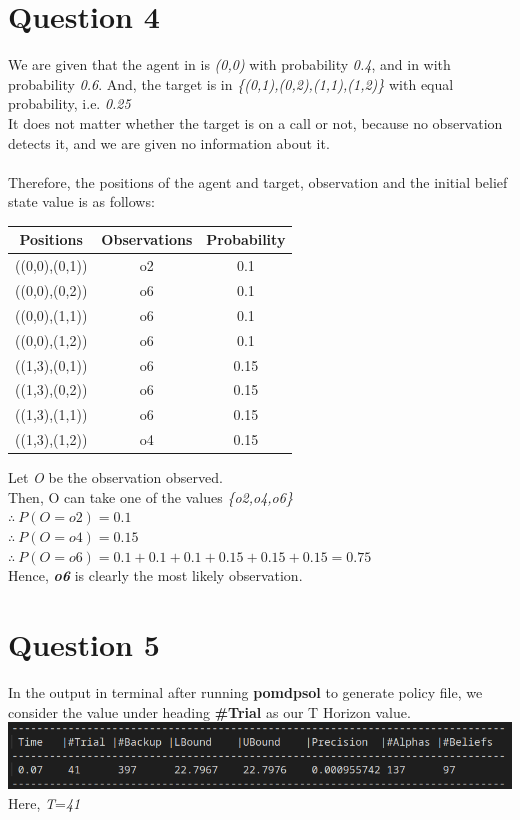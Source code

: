 \documentclass[12pt]{report}
\theoremstyle{definition}
\theoremstyle{plain}
\begin{document}
\section*{Question 4}
We are given that the agent in is \emph{(0,0)} with probability \emph{0.4}, and in  with probability \emph{0.6}. And, the target is in \emph{\{(0,1),(0,2),(1,1),(1,2)\}} with equal probability, i.e. \emph{0.25} \\
It does not matter whether the target is on a call or not, because no observation detects it, and we are given no information about it. \\ \\
Therefore, the positions of the agent and target, observation and the initial belief state value is as follows: \\
\begin{center}
 \begin{tabular}{||c | c | c ||} 
 \hline
 Positions & Observations & Probability \\ [0.5ex] 
 \hline\hline
((0,0),(0,1)) & o2 & 0.1 \\ \hline
((0,0),(0,2)) & o6 & 0.1 \\ \hline
((0,0),(1,1)) & o6 & 0.1 \\ \hline
((0,0),(1,2)) & o6 & 0.1 \\ \hline
((1,3),(0,1)) & o6 & 0.15 \\ \hline
((1,3),(0,2)) & o6 & 0.15 \\ \hline
((1,3),(1,1)) & o6 & 0.15 \\ \hline
((1,3),(1,2)) & o4 & 0.15 \\ \hline
\end{tabular}
\end{center}
Let \emph{O} be the observation observed. \\
Then, O can take one of the values \emph{\{o2,o4,o6\}} \\
$\therefore\ P(O=o2)=0.1$ \\
$\therefore\ P(O=o4)=0.15$ \\
$\therefore\ P(O=o6)=0.1+0.1+0.1+0.15+0.15+0.15=0.75$ \\
Hence, \textbf{\emph{o6}} is clearly the most likely observation.
\vspace{0.2cm} \\ \hline
\section*{Question 5}
In the output in terminal after running \textbf{pomdpsol} to generate policy file, we consider the value under heading \textbf{\#Trial} as our T Horizon value. \\
\includegraphics[width=\textwidth]{q5.png} \\
Here, \emph{T}=\emph{41} \\
\end{document}
